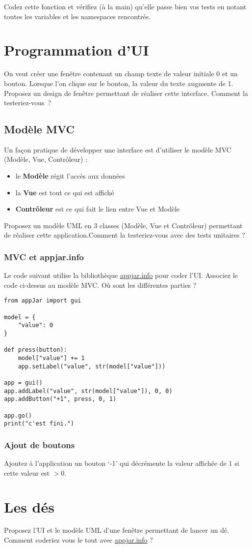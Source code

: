 \documentclass[12pt]{article}
\begin{document}
Codez cette fonction et vérifiez (à la main) qu'elle passe bien vos tests en notant toutes les variables et les namespaces rencontrés.

\section{Programmation d'UI}

On veut créer une fenêtre contenant un champ texte de valeur initiale 0 et un bouton. Lorsque l'on clique sur le bouton, la valeur du texte augmente de 1.
Proposez un design de fenêtre permettant de réaliser cette interface.
Comment la testeriez-vous~?

\subsection{Modèle MVC}

Un façon pratique de développer une interface est d'utiliser le modèle MVC (Modèle, Vue, Contrôleur) :
\begin{itemize}
	\item le {\bf Modèle} régit l'accès aux données
  \item la {\bf Vue} est tout ce qui est affiché
  \item {\bf Contrôleur} est ce qui fait le lien entre Vue et Modèle

\end{itemize}
Proposez un modèle UML en 3 classes (Modèle, Vue et Contrôleur) permettant de réaliser cette application.Comment la testeriez-vous avec des tests unitaires ?

\subsubsection{MVC et appjar.info}

Le code suivant utilise la bibliothèque \url{appjar.info} pour coder l'UI. Associez le code ci-dessus au modèle MVC. Où sont les différentes parties ? 

\lstset{language=Python}
\begin{lstlisting}
from appJar import gui

model = {
    "value": 0
}

def press(button):
    model["value"] += 1
    app.setLabel("value", str(model["value"]))

app = gui()
app.addLabel("value", str(model["value"]), 0, 0)
app.addButton("+1", press, 0, 1)

app.go()
print("c'est fini.")
\end{lstlisting}




\subsubsection{Ajout de boutons}

Ajoutez à  l'application un bouton `-1' qui décrémente la valeur affichée de 1 si cette valeur est $>0$.

\section{Les dés}

Proposez l'UI et le modèle UML d'une fenêtre permettant de lancer un dé. Comment coderiez vous le tout avec \url{appjar.info} ?
\end{document}
